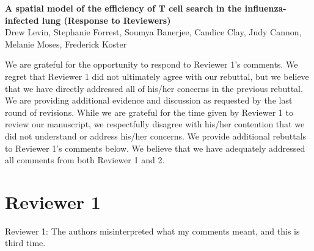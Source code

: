 \documentclass[10pt]{article}
\date{}
\begin{document}
\begin{flushleft}
{\Large
\textbf{A spatial model of the efficiency of T cell search in the influenza-infected lung (Response to Reviewers)}
}
\\
Drew Levin, 
Stephanie Forrest, 
Soumya Banerjee,
Candice Clay,
Judy Cannon, 
Melanie Moses, 
Frederick Koster
\end{flushleft}
\vspace{0.5cm}




We are grateful for the opportunity to respond to Reviewer 1's comments. We regret that Reviewer 1 did not ultimately agree with our rebuttal, but we believe that we have directly addressed all of his/her concerns in the previous rebuttal. We are providing additional evidence and discussion as requested by the last round of revisions. While we are grateful for the time given by Reviewer 1 to review our manuscript, we respectfully disagree with his/her contention that we did not understand or address his/her concerns. We provide additional rebuttals to Reviewer 1's comments below. We believe that we have adequately addressed all comments from both Reviewer 1 and 2.

\section*{Reviewer 1}

Reviewer 1: The authors misinterpreted what my comments meant, and this is third time.
\end{document}

